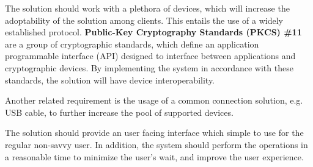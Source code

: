 The solution should work with a plethora of devices, which will increase the adoptability of the solution among clients. This entails the use of a widely established protocol.
\textbf{Public-Key Cryptography Standards (PKCS) \#11} are a group of cryptographic standards, which define an application programmable interface (API) designed to interface between applications and cryptographic devices. By implementing the system in accordance with these standards, the solution will have device interoperability.

Another related requirement is the usage of a common connection solution, e.g. USB cable, to further increase the pool of supported devices.

The solution should provide an user facing interface which simple to use for the regular non-savvy user.
In addition, the system should perform the operations in a reasonable time to minimize the user's wait, and improve the user experience.
